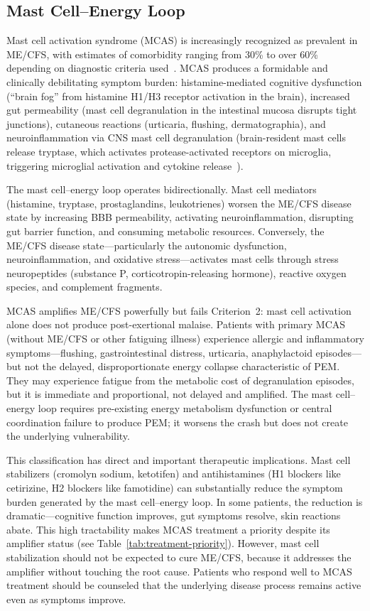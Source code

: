 \subsection{Mast Cell--Energy Loop}
\label{sec:amp-mast-cell}

Mast cell activation syndrome (MCAS) is increasingly recognized as prevalent in ME/CFS, with estimates of comorbidity ranging from 30\% to over 60\% depending on diagnostic criteria used~\cite{Castells2024mcasreview}. MCAS produces a formidable and clinically debilitating symptom burden: histamine-mediated cognitive dysfunction (``brain fog'' from histamine H1/H3 receptor activation in the brain), increased gut permeability (mast cell degranulation in the intestinal mucosa disrupts tight junctions), cutaneous reactions (urticaria, flushing, dermatographia), and neuroinflammation via CNS mast cell degranulation (brain-resident mast cells release tryptase, which activates protease-activated receptors on microglia, triggering microglial activation and cytokine release~\cite{Theoharides2021Cells}).

The mast cell--energy loop operates bidirectionally. Mast cell mediators (histamine, tryptase, prostaglandins, leukotrienes) worsen the ME/CFS disease state by increasing BBB permeability, activating neuroinflammation, disrupting gut barrier function, and consuming metabolic resources. Conversely, the ME/CFS disease state---particularly the autonomic dysfunction, neuroinflammation, and oxidative stress---activates mast cells through stress neuropeptides (substance P, corticotropin-releasing hormone), reactive oxygen species, and complement fragments.

MCAS amplifies ME/CFS powerfully but fails Criterion~2: mast cell activation alone does not produce post-exertional malaise. Patients with primary MCAS (without ME/CFS or other fatiguing illness) experience allergic and inflammatory symptoms---flushing, gastrointestinal distress, urticaria, anaphylactoid episodes---but not the delayed, disproportionate energy collapse characteristic of PEM. They may experience fatigue from the metabolic cost of degranulation episodes, but it is immediate and proportional, not delayed and amplified. The mast cell--energy loop requires pre-existing energy metabolism dysfunction or central coordination failure to produce PEM; it worsens the crash but does not create the underlying vulnerability.

This classification has direct and important therapeutic implications. Mast cell stabilizers (cromolyn sodium, ketotifen) and antihistamines (H1 blockers like cetirizine, H2 blockers like famotidine) can substantially reduce the symptom burden generated by the mast cell--energy loop. In some patients, the reduction is dramatic---cognitive function improves, gut symptoms resolve, skin reactions abate. This high tractability makes MCAS treatment a priority despite its amplifier status (see Table~\ref{tab:treatment-priority}). However, mast cell stabilization should not be expected to cure ME/CFS, because it addresses the amplifier without touching the root cause. Patients who respond well to MCAS treatment should be counseled that the underlying disease process remains active even as symptoms improve.


